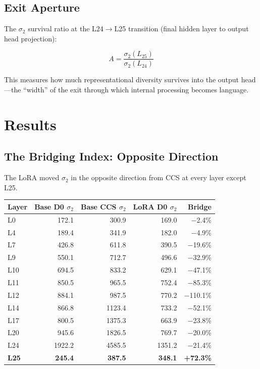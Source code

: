 \documentclass[12pt]{article}
\begin{document}
\subsection{Exit Aperture}

The $\sigma_2$ survival ratio at the L24$\rightarrow$L25 transition (final hidden layer to output head projection):

\[
A = \frac{\sigma_2(L_{25})}{\sigma_2(L_{24})}
\]

This measures how much representational diversity survives into the output head---the ``width'' of the exit through which internal processing becomes language.

\section{Results}

\subsection{The Bridging Index: Opposite Direction}

The LoRA moved $\sigma_2$ in the opposite direction from CCS at every layer except L25.

\begin{table}[h]
\centering
\begin{tabular}{lrrrr}
\toprule
\textbf{Layer} & \textbf{Base D0 $\sigma_2$} & \textbf{Base CCS $\sigma_2$} & \textbf{LoRA D0 $\sigma_2$} & \textbf{Bridge} \\
\midrule
L0 & 172.1 & 300.9 & 169.0 & $-$2.4\% \\
L4 & 189.4 & 341.9 & 182.0 & $-$4.9\% \\
L7 & 426.8 & 611.8 & 390.5 & $-$19.6\% \\
L9 & 550.1 & 712.7 & 496.6 & $-$32.9\% \\
L10 & 694.5 & 833.2 & 629.1 & $-$47.1\% \\
L11 & 850.5 & 965.5 & 752.4 & $-$85.3\% \\
L12 & 884.1 & 987.5 & 770.2 & $-$110.1\% \\
L14 & 866.8 & 1123.4 & 733.2 & $-$52.1\% \\
L17 & 800.5 & 1375.3 & 663.9 & $-$23.8\% \\
L20 & 945.6 & 1826.5 & 769.7 & $-$20.0\% \\
L24 & 1922.2 & 4585.5 & 1351.2 & $-$21.4\% \\
\textbf{L25} & \textbf{245.4} & \textbf{387.5} & \textbf{348.1} & \textbf{+72.3\%} \\
\bottomrule
\end{tabular}
\end{table}
\end{document}
